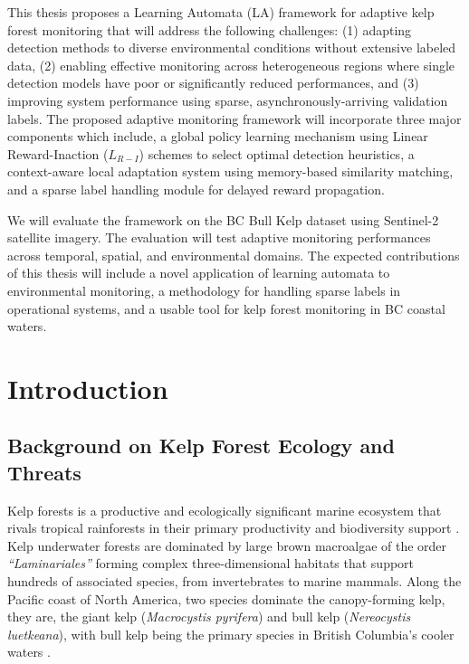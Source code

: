 \documentclass[12pt,oneside]{book}
\begin{document}
This thesis proposes a Learning Automata (LA) framework for adaptive kelp forest monitoring that will address the following challenges: (1) adapting detection methods to diverse environmental conditions without extensive labeled data, (2) enabling effective monitoring across heterogeneous regions where single detection models have poor or significantly reduced performances, and (3) improving system performance using sparse, asynchronously-arriving validation labels. The proposed adaptive monitoring framework will incorporate three major components which include, a global policy learning mechanism using Linear Reward-Inaction ($L_{R-I}$) schemes to select optimal detection heuristics, a context-aware local adaptation system using memory-based similarity matching, and a sparse label handling module for delayed reward propagation.

We will evaluate the framework on the BC Bull Kelp dataset using Sentinel-2 satellite imagery. The evaluation will test adaptive monitoring performances across temporal, spatial, and environmental domains. The expected contributions of this thesis will include a novel application of learning automata to environmental monitoring, a methodology for handling sparse labels in operational systems, and a usable tool for kelp forest monitoring in BC coastal waters.

\tableofcontents

\chapter{Introduction}
\label{ch:introduction}

\section{Background on Kelp Forest Ecology and Threats}
\label{sec:background}

Kelp forests is a productive and ecologically significant marine ecosystem that rivals tropical rainforests in their primary productivity and biodiversity support \citep{Steneck2002}. Kelp underwater forests are dominated by large brown macroalgae of the order \textit{``Laminariales''} forming complex three-dimensional habitats that support hundreds of associated species, from invertebrates to marine mammals. Along the Pacific coast of North America, two species dominate the canopy-forming kelp, they are, the giant kelp (\textit{Macrocystis pyrifera}) and bull kelp (\textit{Nereocystis luetkeana}), with bull kelp being the primary species in British Columbia's cooler waters \citep{Schroeder2020}.
\end{document}
